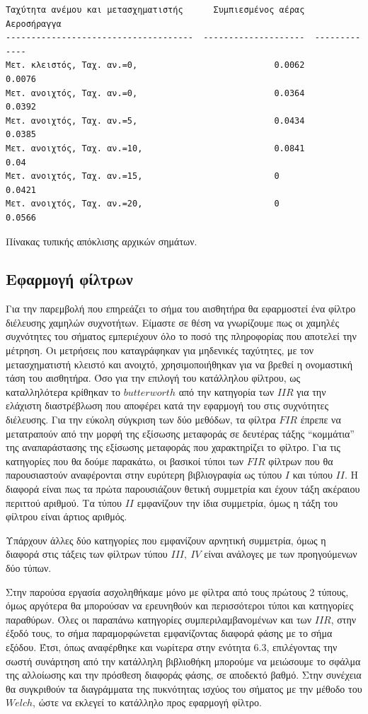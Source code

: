 \documentclass[breaklines=true, 12pt]{article}
\begin{document}
\begin{verbatim}
Ταχύτητα ανέμου και μετασχηματιστής      Συμπιεσμένος αέρας    Αεροσήραγγα
-------------------------------------  --------------------  -------------
Μετ. κλειστός, Ταχ. αν.=0,                           0.0062         0.0076
Μετ. ανοιχτός, Ταχ. αν.=0,                           0.0364         0.0392
Μετ. ανοιχτός, Ταχ. αν.=5,                           0.0434         0.0385
Μετ. ανοιχτός, Ταχ. αν.=10,                          0.0841         0.04
Μετ. ανοιχτός, Ταχ. αν.=15,                          0              0.0421
Μετ. ανοιχτός, Ταχ. αν.=20,                          0              0.0566
\end{verbatim}
Πίνακας τυπικής απόκλισης αρχικών σημάτων.

\subsection{Εφαρμογή φίλτρων}
\label{sec:orgf181228}
Για την παρεμβολή που επηρεάζει το σήμα του αισθητήρα θα εφαρμοστεί ένα φίλτρο
διέλευσης χαμηλών συχνοτήτων. Είμαστε σε θέση να γνωρίζουμε πως οι χαμηλές
συχνότητες του σήματος εμπεριέχουν όλο το ποσό της πληροφορίας που αποτελεί
την μέτρηση. Οι μετρήσεις που καταγράφηκαν για μηδενικές ταχύτητες, με τον
μετασχηματιστή κλειστό και ανοιχτό, χρησιμοποιήθηκαν για να βρεθεί η
ονομαστική τάση του αισθητήρα. Όσο για την επιλογή του κατάλληλου φίλτρου,
ως καταλληλότερα κρίθηκαν το \(butterworth\) από την κατηγορία των \(IIR\) για την
ελάχιστη διαστρέβλωση που αποφέρει κατά την εφαρμογή του στις συχνότητες
διέλευσης. Για την εύκολη σύγκριση των δύο μεθόδων, τα φίλτρα \(FIR\) έπρεπε να
μετατραπούν από την μορφή της εξίσωσης μεταφοράς σε δευτέρας τάξης “κομμάτια”
της αναπαράστασης της εξίσωσης μεταφοράς που χαρακτηρίζει το φίλτρο. Για τις
κατηγορίες που θα δούμε παρακάτω, οι βασικοί τύποι των \(FIR\) φίλτρων που θα
παρουσιαστούν αναφέρονται στην ευρύτερη βιβλιογραφία ως τύπου \(I\) και τύπου \(II\).
Η διαφορά είναι πως τα πρώτα παρουσιάζουν θετική συμμετρία και έχουν τάξη
ακέραιου περιττού αριθμού. Τα τύπου \(II\) εμφανίζουν την ίδια συμμετρία, όμως
η τάξη του φίλτρου είναι άρτιος αριθμός.

Υπάρχουν άλλες δύο κατηγορίες που εμφανίζουν αρνητική συμμετρία, όμως η
διαφορά στις τάξεις των φίλτρων τύπου \(III,\ IV\) είναι ανάλογες με των προηγούμενων
δύο τύπων.

Στην παρούσα εργασία ασχοληθήκαμε μόνο με φίλτρα από τους πρώτους 2 τύπους,
όμως αργότερα θα μπορούσαν να ερευνηθούν και περισσότεροι τύποι και
κατηγορίες παραθύρων. Όλες οι παραπάνω κατηγορίες συμπεριλαμβανομένων και
των \(IIR\), στην έξοδό τους, το σήμα παραμορφώνεται εμφανίζοντας διαφορά φάσης
με το σήμα εξόδου. Έτσι, όπως αναφέρθηκε και νωρίτερα στην ενότητα 6.3,
επιλέγοντας την σωστή συνάρτηση από την κατάλληλη βιβλιοθήκη μπορούμε να
μειώσουμε το σφάλμα της αλλοίωσης και την πρόσθεση διαφοράς φάσης, σε
αποδεκτό βαθμό. Στην συνέχεια θα συγκριθούν τα διαγράμματα της πυκνότητας
ισχύος του σήματος με την μέθοδο του \(Welch\), ώστε να εκλεγεί το κατάλληλο
προς εφαρμογή φίλτρο.
\end{document}

